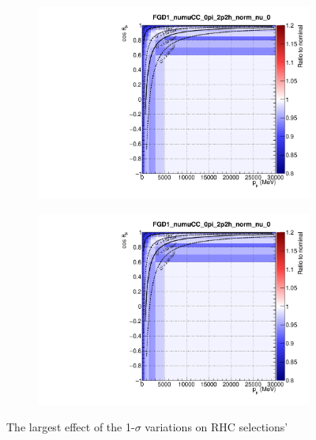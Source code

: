 \begin{figure}[h]
\begin{subfigure}[t]{0.24\textwidth}
	\includegraphics[width=\textwidth,page=27]{figures/mach3/sigmavar/Full_1sigmaVar_18July_BeRPA_U_ND280_sigmavar_highest_all}
\end{subfigure}
\begin{subfigure}[t]{0.24\textwidth}
	\includegraphics[width=\textwidth,page=28]{figures/mach3/sigmavar/Full_1sigmaVar_18July_BeRPA_U_ND280_sigmavar_highest_all}
\end{subfigure}

\caption{The largest effect of the 1-$\sigma$ variations on RHC selections' \pmu \cosmu}
\label{fig:onesigma_rhc}
\end{figure}

